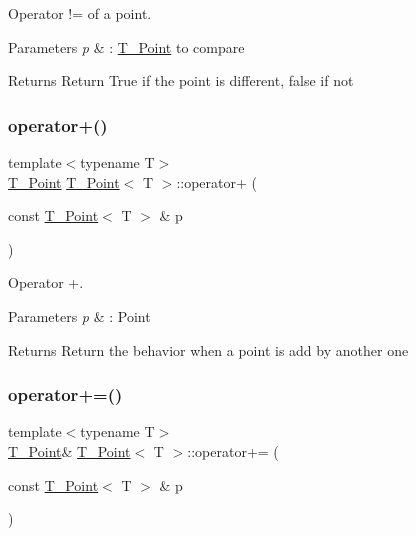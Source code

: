Operator != of a point. 


\begin{DoxyParams}{Parameters}
{\em p} & \+: \hyperlink{classT__Point}{T\+\_\+\+Point} to compare \\
\hline
\end{DoxyParams}
\begin{DoxyReturn}{Returns}
Return True if the point is different, false if not 
\end{DoxyReturn}
\mbox{\label{classT__Point_a1f94a7a19cc8711e7784f700ea59297a}} 
\subsubsection{\texorpdfstring{operator+()}{operator+()}}
{\footnotesize\ttfamily template$<$typename T$>$ \\
\hyperlink{classT__Point}{T\+\_\+\+Point} \hyperlink{classT__Point}{T\+\_\+\+Point}$<$ T $>$\+::operator+ (\begin{DoxyParamCaption}\item[{const \hyperlink{classT__Point}{T\+\_\+\+Point}$<$ T $>$ \&}]{p }\end{DoxyParamCaption})\hspace{0.3cm}{\ttfamily [inline]}}



Operator +. 


\begin{DoxyParams}{Parameters}
{\em p} & \+: Point \\
\hline
\end{DoxyParams}
\begin{DoxyReturn}{Returns}
Return the behavior when a point is add by another one 
\end{DoxyReturn}
\mbox{\label{classT__Point_a4fa7b8ceb837c81e608d5ddad0f1ffe7}} 
\subsubsection{\texorpdfstring{operator+=()}{operator+=()}}
{\footnotesize\ttfamily template$<$typename T$>$ \\
\hyperlink{classT__Point}{T\+\_\+\+Point}\& \hyperlink{classT__Point}{T\+\_\+\+Point}$<$ T $>$\+::operator+= (\begin{DoxyParamCaption}\item[{const \hyperlink{classT__Point}{T\+\_\+\+Point}$<$ T $>$ \&}]{p }\end{DoxyParamCaption})\hspace{0.3cm}{\ttfamily [inline]}}



